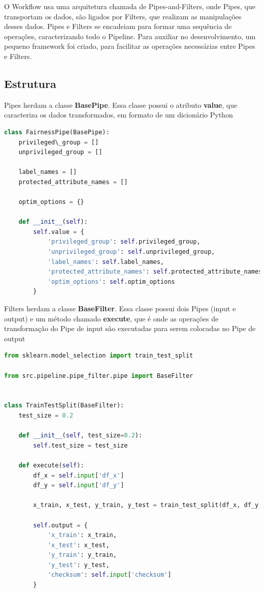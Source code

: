 \documentclass[Portugues,Final]{ic-tese-v3}
\begin{document}
O Workflow usa uma arquitetura chamada de Pipes-and-Filters, onde Pipes, que transportam os dados, são ligados por Filters, que realizam as manipulações desses dados. Pipes e Filters se encadeiam para formar uma sequência de operações, caracterizando todo o Pipeline. Para auxiliar no desenvolvimento, um pequeno framework foi criado, para facilitar as operações necessárias entre Pipes e Filters. 

\subsection{Estrutura}

Pipes herdam a classe \textbf{BasePipe}. Essa classe possui o atributo \textbf{value}, que caracteriza os dados transformados, em formato de um dicionário Python

\begin{lstlisting}[language=Python, label=cod:FairnessPipeClass]
class FairnessPipe(BasePipe):
    privileged\_group = []
    unprivileged_group = []

    label_names = []
    protected_attribute_names = []

    optim_options = {}

    def __init__(self):
        self.value = {
            'privileged_group': self.privileged_group,
            'unprivileged_group': self.unprivileged_group,
            'label_names': self.label_names,
            'protected_attribute_names': self.protected_attribute_names,
            'optim_options': self.optim_options
        }
\end{lstlisting}

Filters herdam a classe \textbf{BaseFilter}. Essa classe possui dois Pipes (input e output) e um método chamado \textbf{execute}, que é onde as operações de transformação do Pipe de input são executadas para serem colocadas no Pipe de output

\begin{lstlisting}[language=Python, label=cod:TrainTestSplitClass]
from sklearn.model_selection import train_test_split

from src.pipeline.pipe_filter.pipe import BaseFilter


class TrainTestSplit(BaseFilter):
    test_size = 0.2

    def __init__(self, test_size=0.2):
        self.test_size = test_size

    def execute(self):
        df_x = self.input['df_x']
        df_y = self.input['df_y']

        x_train, x_test, y_train, y_test = train_test_split(df_x, df_y, test_size=self.test_size, random_state=42)

        self.output = {
            'x_train': x_train,
            'x_test': x_test,
            'y_train': y_train,
            'y_test': y_test,
            'checksum': self.input['checksum']
        }
\end{lstlisting}
\end{document}
